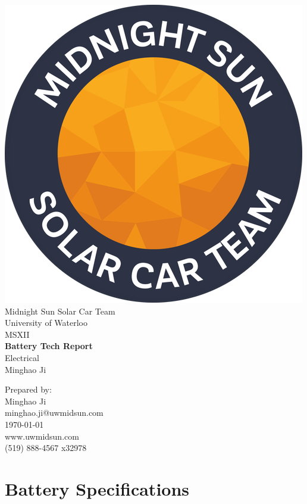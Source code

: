 \documentclass[10pt]{article}
\makeatletter
\newcommand\theteamname{Midnight Sun Solar Car Team} %
\newcommand\theuniversityname{University of Waterloo} %
\newcommand\theteamwebsite{www.uwmidsun.com} %
\newcommand\theteamphone{(519) 888-4567 x32978} %
\newcommand\thetitle{Battery Tech Report} %
\newcommand\thesubtitle{Electrical} %
\newcommand\theauthor{Minghao Ji} %
\newcommand\theauthorcontact{minghao.ji@uwmidsun.com} %
\newcommand\thedate{\today} %
\makeatother
\begin{document}
\begin{titlepage}
\large
\vspace*{2cm}
\centering
\includegraphics[width=.25\textwidth]{./figures/midnightSunLogoCircle.png} \\
\vspace{1.5cm}
{\LARGE \theteamname} \\
\theuniversityname \\
\vspace{2.2cm}
{\LARGE MSXII} \\
\vspace{0.4cm}
{\huge\bfseries \thetitle} \\
\vspace{0.2cm}
{\LARGE \thesubtitle} \\
\vspace{2.2cm}
\ifdefined \theauthor
\par Prepared by: \\
\theauthor \\
\theauthorcontact \\
\fi
\thedate \\
\vfill
\theteamwebsite \\
\theteamphone
\end{titlepage}

\tableofcontents

\newpage

\section{Battery Specifications}
\end{document}
